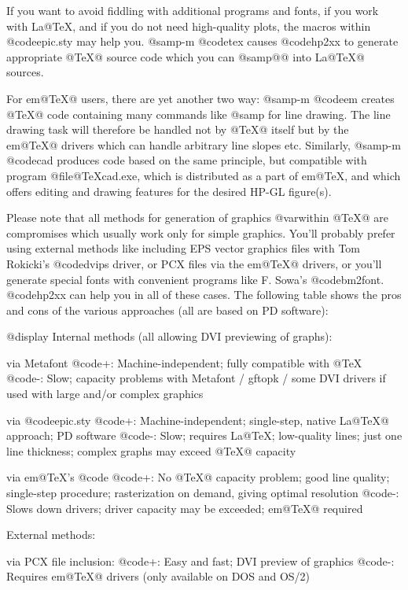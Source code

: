 If you want to avoid fiddling with additional programs and fonts, if you
work with La@TeX{}, and if you do not need high-quality plots,
the macros within @code{epic.sty} may help you.
@samp{-m @code{tex}} causes @code{hp2xx} to generate
appropriate @TeX{}@ source code which you can @samp{@{@}} into
La@TeX{}@ sources.

For em@TeX{}@ users, there are yet another two way: @samp{-m @code{em}}
creates @TeX{}@ code containing many commands like @samp{}
for line drawing. The line drawing task will therefore be handled not by
@TeX{}@ itself but by the em@TeX{}@ drivers which can handle arbitrary
line slopes etc. Similarly, @samp{-m @code{cad}} produces code based on
the same principle, but compatible with program @file{@TeX{}cad.exe}, which is
distributed as a part of em@TeX{}, and which offers editing and drawing
features for the desired HP-GL figure(s).

Please note that all methods for generation of graphics @var{within}
@TeX{}@ are compromises which usually work only for simple graphics.
You'll probably prefer using external methods like including EPS vector
graphics files with Tom Rokicki's @code{dvips} driver, or PCX files via the
em@TeX{}@ drivers, or you'll generate special fonts with convenient
programs like F. Sowa's @code{bm2font}. @code{hp2xx} can help you in all
of these cases. The following table shows the pros and cons of the
various approaches (all are based on PD software):

@display
Internal methods (all allowing DVI previewing of graphs):

via Metafont
  @code{+:} Machine-independent; fully compatible with @TeX{}
  @code{-:} Slow; capacity problems with Metafont / gftopk / some DVI drivers
            if used with large and/or complex graphics

via @code{epic.sty}
  @code{+:} Machine-independent; single-step, native La@TeX{}@ approach; PD software
  @code{-:} Slow; requires La@TeX{}; low-quality lines; just one line thickness;
            complex graphs may exceed @TeX{}@ capacity

via em@TeX{}'s @code{}
  @code{+:} No @TeX{}@ capacity problem; good line quality; single-step procedure;
            rasterization on demand, giving optimal resolution
  @code{-:} Slows down drivers; driver capacity may be exceeded; em@TeX{}@ required


External methods:

via PCX file inclusion:
  @code{+:} Easy and fast; DVI preview of graphics
  @code{-:} Requires em@TeX{}@ drivers (only available on DOS and OS/2)

